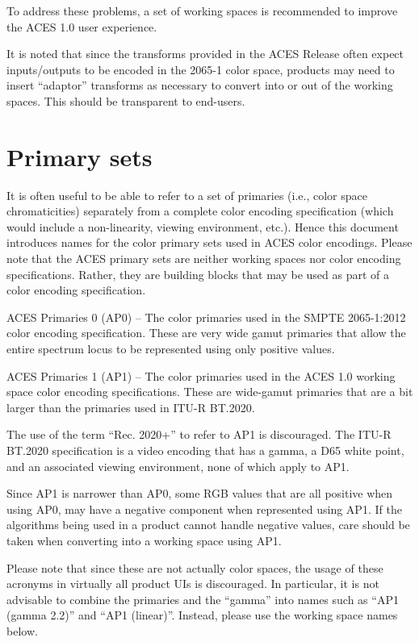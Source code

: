 To address these problems, a set of working spaces is recommended to improve the ACES 1.0 user experience.

It is noted that since the transforms provided in the ACES Release often expect inputs/outputs to be encoded in the 2065-1 color space, products may need to insert ``adaptor'' transforms as necessary to convert into or out of the working spaces. This should be transparent to end-users.

\section{Primary sets}
It is often useful to be able to refer to a set of primaries (i.e., color space chromaticities) separately from a complete color encoding specification (which would include a non-linearity, viewing environment, etc.). Hence this document introduces names for the color primary sets used in ACES color encodings. Please note that the ACES primary sets are neither working spaces nor color encoding specifications. Rather, they are building blocks that may be used as part of a color encoding specification.

ACES Primaries 0 (AP0) -- The color primaries used in the SMPTE 2065-1:2012 color encoding specification. These are very wide gamut primaries that allow the entire spectrum locus to be represented using only positive values.

ACES Primaries 1 (AP1) -- The color primaries used in the ACES 1.0 working space color encoding specifications. These are wide-gamut primaries that are a bit larger than the primaries used in ITU-R BT.2020.

The use of the term ``Rec. 2020+'' to refer to AP1 is discouraged. The ITU-R BT.2020 specification is a video encoding that has a gamma, a D65 white point, and an associated viewing environment, none of which apply to AP1.

Since AP1 is narrower than AP0, some RGB values that are all positive when using AP0, may have a negative component when represented using AP1. If the algorithms being used in a product cannot handle negative values, care should be taken when converting into a working space using AP1.

Please note that since these are not actually color spaces, the usage of these acronyms in virtually all product UIs is discouraged. In particular, it is not advisable to combine the primaries and the ``gamma'' into names such as ``AP1 (gamma 2.2)'' and ``AP1 (linear)''. Instead, please use the working space names below.

